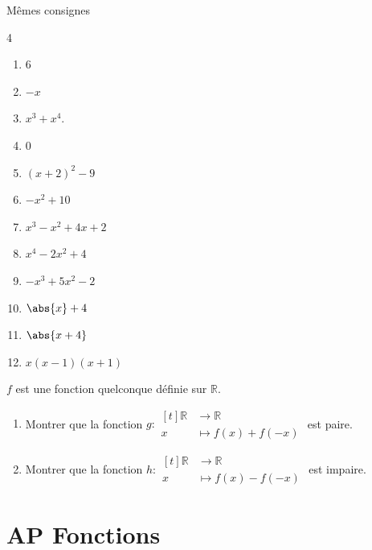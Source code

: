 \documentclass[main.tex]{subfiles}
\begin{document}
\begin{exercise}Mêmes consignes
\begin{multicols}{4}
\begin{enumerate}[ label={$f(x)=$},leftmargin=*]
	\item $6$
	\item $-x$
	\item $x^3+x^4$.
	\item $0$
	\item $(x+2)^2-9$
	\item $-x^2+10$
	\item $x^3-x^2+4x+2$
	\item $x^4-2x^2 + 4$
	\item $-x^3+5x^2 -2$
	\item $\abs{x}+4$
	\item $\abs{x+4}$
	\item $x(x-1)(x+1)$
\end{enumerate}
	\end{multicols}
\end{exercise} 

\begin{exercise} 
	$f$ est une fonction quelconque définie sur $\mathbb{R}$.
	  \begin{enumerate}[ label=\alph*), leftmargin=*]
		\item  Montrer que la fonction $g\colon  \begin{aligned}[t] \mathbb{R}&\to \mathbb{R}\\
			x&\mapsto f(x)+f(-x) 
		\end{aligned}$ est paire.
		\item Montrer que la fonction $h\colon  \begin{aligned}[t] \mathbb{R}&\to \mathbb{R}\\
			x&\mapsto f(x)-f(-x) 
		\end{aligned}$ est impaire.
	\end{enumerate}
\end{exercise} 
%	 
\newpage  
\section{AP Fonctions}   
\end{document}
